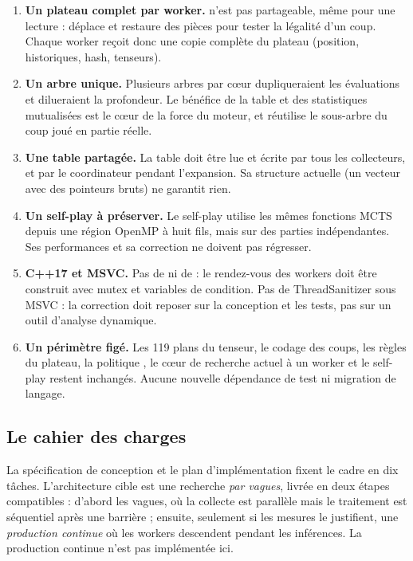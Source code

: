 \begin{enumerate}[leftmargin=1.4em]
  \item \textbf{Un plateau complet par worker.}  n'est pas
  partageable, m\^eme pour une lecture :  d\'eplace et
  restaure des pi\`eces pour tester la l\'egalit\'e d'un coup. Chaque worker
  re\c{c}oit donc une copie compl\`ete du plateau (position, historiques,
  hash, tenseurs).
  \item \textbf{Un arbre unique.} Plusieurs arbres par c\oe{}ur dupliqueraient
  les \'evaluations et dilueraient la profondeur. Le b\'en\'efice de la table
  et des statistiques mutualis\'ees est le c\oe{}ur de la force du moteur, et
   r\'eutilise le sous-arbre du coup jou\'e en partie
  r\'eelle.
  \item \textbf{Une table partag\'ee.} La table doit \^etre lue et \'ecrite
  par tous les collecteurs, et par le coordinateur pendant l'expansion. Sa
  structure actuelle (un vecteur avec des pointeurs bruts) ne garantit rien.
  \item \textbf{Un self-play \`a pr\'eserver.} Le self-play utilise les m\^emes
  fonctions MCTS depuis une r\'egion OpenMP \`a huit fils, mais sur des
  parties ind\'ependantes. Ses performances et sa correction ne doivent pas
  r\'egresser.
  \item \textbf{C++17 et MSVC.} Pas de  ni de
   : le rendez-vous des workers doit \^etre construit avec
  mutex et variables de condition. Pas de ThreadSanitizer sous MSVC : la
  correction doit reposer sur la conception et les tests, pas sur un outil
  d'analyse dynamique.
  \item \textbf{Un p\'erim\`etre fig\'e.} Les 119 plans du tenseur, le
  codage des coups, les r\`egles du plateau, la politique , le
  c\oe{}ur de recherche actuel \`a un worker et le self-play restent
  inchang\'es. Aucune nouvelle d\'ependance de test ni migration de langage.
\end{enumerate}

\subsection{Le cahier des charges}

La sp\'ecification de conception \cite{multicore-design} et le plan
d'impl\'ementation \cite{multicore-plan} fixent le cadre en dix t\^aches.
L'architecture cible est une recherche \emph{par vagues}, livr\'ee en deux
\'etapes compatibles : d'abord les vagues, o\`u la collecte est parall\`ele
mais le traitement est s\'equentiel apr\`es une barri\`ere ; ensuite, seulement
si les mesures le justifient, une \emph{production continue} o\`u les workers
descendent pendant les inf\'erences. La production continue n'est pas
impl\'ement\'ee ici.

